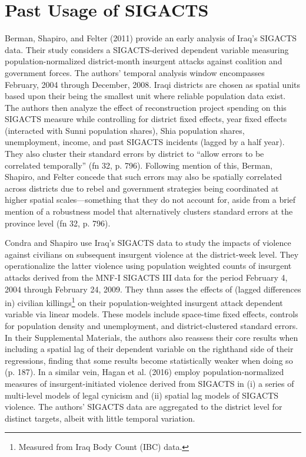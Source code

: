 \documentclass[12pt]{article}
\begin{document}
\section{Past Usage of SIGACTS}
Berman, Shapiro, and Felter (2011) provide an early analysis of Iraq's SIGACTS data. Their study considers a SIGACTS-derived dependent variable measuring population-normalized district-month insurgent attacks against coalition and government forces. The authors' temporal analysis window encompasses February, 2004 through December, 2008. Iraqi districts are chosen as spatial units based upon their being the smallest unit where reliable population data exist. The authors then analyze the effect of reconstruction project spending on this SIGACTS measure while controlling for district fixed effects, year fixed effects (interacted with Sunni population shares), Shia population shares, unemployment, income, and past SIGACTS incidents (lagged by a half year). They also cluster their standard errors by district to ``allow errors to be correlated temporally'' (fn 32, p. 796). Following mention of this, Berman, Shapiro, and Felter concede that such errors may also be spatially correlated across districts due to rebel and government strategies being coordinated at higher spatial scales---something that they do not account for, aside from a brief mention of a robustness model that alternatively clusters standard errors at the province level (fn 32, p. 796).

Condra and Shapiro use Iraq's SIGACTS data to study the impacts of violence against civilians on subsequent insurgent violence at the district-week level. They operationalize the latter violence using population weighted counts of insurgent attacks derived from the MNF-I SIGACTS III data for the period February 4, 2004 through February 24, 2009. They thnn asses the effects of (lagged differences in) civilian killings\footnote{Measured from Iraq Body Count (IBC) data.} on their population-weighted insurgent attack dependent variable via linear models. These models include space-time fixed effects, controls for population density and unemployment, and district-clustered standard errors. In their Supplemental Materials, the authors also reassess their core results when including a spatial lag of their dependent variable on the righthand side of their regressions, finding that some results become statistically weaker when doing so (p. 187). In a similar vein, Hagan et al. (2016) employ population-normalized measures of insurgent-initiated violence derived from SIGACTS in (i) a series of multi-level models of legal cynicism and (ii) spatial lag models of SIGACTS violence. The authors' SIGACTS data are aggregated to the district level for distinct targets, albeit with little temporal variation.
\end{document}
